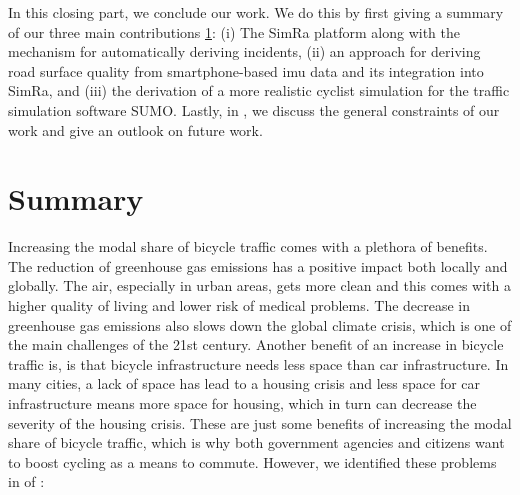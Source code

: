 \vspace*{\fill}
In this closing part, we conclude our work.
We do this by first giving a summary of our three main contributions \ref{cha:summary}: (i) The SimRa platform along with the mechanism for automatically deriving incidents, (ii) an approach for deriving road surface quality from smartphone-based \ac{imu} data and its integration into SimRa, and (iii) the derivation of a more realistic cyclist simulation for the traffic simulation software SUMO.
Lastly, in , we discuss the general constraints of our work and give an outlook on future work.
\vspace*{\fill}
\chapter{Summary}
\label{cha:summary}
Increasing the modal share of bicycle traffic comes with a plethora of benefits.
The reduction of greenhouse gas emissions has a positive impact both locally and globally.
The air, especially in urban areas, gets more clean and this comes with a higher quality of living and lower risk of medical problems.
The decrease in greenhouse gas emissions also slows down the global climate crisis, which is one of the main challenges of the 21st century.
Another benefit of an increase in bicycle traffic is, is that bicycle infrastructure needs less space than car infrastructure.
In many cities, a lack of space has lead to a housing crisis and less space for car infrastructure means more space for housing, which in turn can decrease the severity of the housing crisis.
These are just some benefits of increasing the modal share of bicycle traffic, which is why both government agencies and citizens want to boost cycling as a means to commute.
However, we identified these problems in  of :

